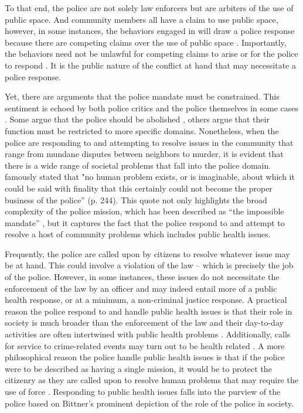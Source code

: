 \noindent To that end, the police are not solely law enforcers but are arbiters of the use of public space. And community members all have a claim to use public space, however, in some instances, the behaviors engaged in will draw a police response because there are competing claims over the use of public space \parencite{del_pozo_arrest_2022}. Importantly, the behaviors need not be unlawful for competing claims to arise or for the police to respond \parencite{thacher_order_2014}. It is the public nature of the conflict at hand that may necessitate a police response.

Yet, there are arguments that the police mandate must be constrained. This sentiment is echoed by both police critics and the police themselves in some cases \parencite{hodges_booker_2_2017}. Some argue that the police should be abolished \parencite{vitale_end_2017}, others argue that their function must be restricted to more specific domains. Nonetheless, when the police are responding to and attempting to resolve issues in the community that range from mundane disputes between neighbors to murder, it is evident that there is a wide range of societal problems that fall into the police domain. \textcite{bittner_functions_1970} famously stated that "no human problem exists, or is imaginable, about which it could be said with finality that this certainly could not become the proper business of the police” (p. 244). This quote not only highlights the broad complexity of the police mission, which has been described as “the impossible mandate” \parencite{manning_police_1978}, but it captures the fact that the police respond to and attempt to resolve a host of community problems which includes public health issues.

Frequently, the police are called upon by citizens to resolve whatever issue may be at hand. This could involve a violation of the law – which is precisely the job of the police. However, in some instances, these issues do not necessitate the enforcement of the law by an officer and may indeed entail more of a public health response, or at a minimum, a non-criminal justice response. A practical reason the police respond to and handle public health issues is that their role in society is much broader than the enforcement of the law and their day-to-day activities are often intertwined with public health problems \parencite{wood_private_2020}. Additionally, calls for service to crime-related events may turn out to be health related \parencite{ratcliffe_policing_2021}. A more philosophical reason the police handle public health issues is that if the police were to be described as having a single mission, it would be to protect the citizenry as they are called upon to resolve human problems that may require the use of force \parencite{bittner_functions_1970, skolnick_above_1993}. Responding to public health issues falls into the purview of the police based on Bittner’s prominent depiction of the role of the police in society.

